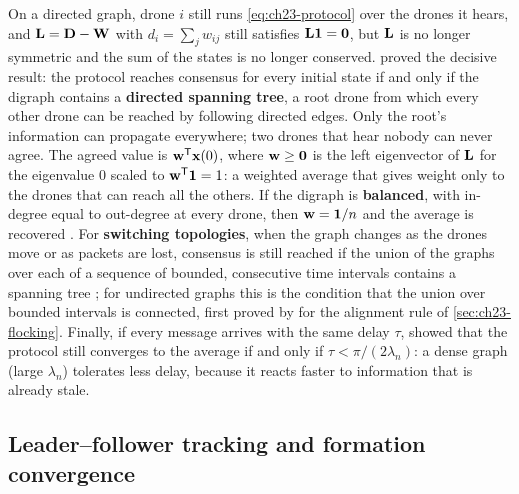 On a directed graph, drone $i$ still runs \cref{eq:ch23-protocol} over the
drones it hears, and $\mathbf{L} = \mathbf{D} - \mathbf{W}$ with $d_i = \sum_j w_{ij}$
still satisfies $\mathbf{L}\mathbf{1} = \mathbf{0}$, but $\mathbf{L}$ is no longer
symmetric and the sum of the states is no longer conserved.
\textcite{ren2005consensus} proved the decisive result: the protocol reaches
consensus for every initial state if and only if the digraph contains a
\textbf{directed spanning tree}, a root drone
from which every other drone can be reached by following directed edges. Only
the root's information can propagate everywhere; two drones that hear nobody
can never agree. The agreed value is $\mathbf{w}^{\mathsf{T}}\mathbf{x}(0)$, where
$\mathbf{w} \ge \mathbf{0}$ is the left eigenvector of $\mathbf{L}$ for the eigenvalue
$0$ scaled to $\mathbf{w}^{\mathsf{T}}\mathbf{1} = 1$: a weighted average that gives weight
only to the drones that can reach all the others. If the digraph is
\textbf{balanced}, with in-degree equal to out-degree at every drone, then
$\mathbf{w} = \mathbf{1}/n$ and the average is recovered
\cite{olfatisaber2004consensus}. For \textbf{switching topologies}, when the
graph changes as the drones move or as packets are lost, consensus is still
reached if the union of the graphs over each of a sequence of bounded,
consecutive time intervals contains a spanning tree
\cite{ren2005consensus}; for undirected graphs this is the condition that the
union over bounded intervals is connected, first proved by
\textcite{jadbabaie2003coordination} for the alignment rule of
\cref{sec:ch23-flocking}. Finally, if every message arrives with the same
delay $\tau$, \textcite{olfatisaber2004consensus} showed that the protocol
still converges to the average if and only if $\tau < \pi/(2\lambda_n)$: a
dense graph (large $\lambda_n$) tolerates less delay, because it reacts faster
to information that is already stale.

\subsection{Leader--follower tracking and formation convergence}

